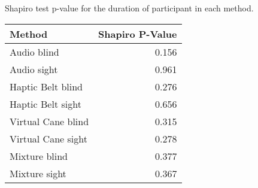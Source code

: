 
\centering
\caption{Shapiro test p-value for the duration of participant in each method.}
\label{tab:shapiro_duration}
\begin{tabular}{lr}
\toprule
            Method &  Shapiro P-Value \\
\midrule
       Audio blind &            0.156 \\
       Audio sight &            0.961 \\
 Haptic Belt blind &            0.276 \\
 Haptic Belt sight &            0.656 \\
Virtual Cane blind &            0.315 \\
Virtual Cane sight &            0.278 \\
     Mixture blind &            0.377 \\
     Mixture sight &            0.367 \\
\bottomrule
\end{tabular}
